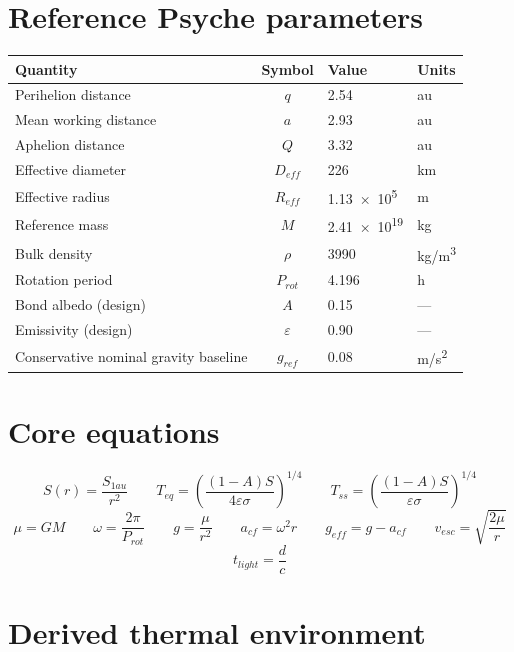 \documentclass[11pt,a4paper]{article}
\begin{document}
\section{Reference Psyche parameters}

\begin{center}
\begin{tabularx}{0.98\textwidth}{@{}l c >{\raggedleft\arraybackslash}X l@{}}
\toprule
Quantity & Symbol & Value & Units \\
\midrule
Perihelion distance & \(q\) & \num{2.54} & au \\
Mean working distance & \(a\) & \num{2.93} & au \\
Aphelion distance & \(Q\) & \num{3.32} & au \\
Effective diameter & \(D_{eff}\) & \num{226} & km \\
Effective radius & \(R_{eff}\) & \num{1.13e5} & m \\
Reference mass & \(M\) & \num{2.41e19} & kg \\
Bulk density & \(\rho\) & \num{3990} & \si{kg/m^3} \\
Rotation period & \(P_{rot}\) & \num{4.196} & h \\
Bond albedo (design) & \(A\) & \num{0.15} & --- \\
Emissivity (design) & \(\varepsilon\) & \num{0.90} & --- \\
Conservative nominal gravity baseline & \(g_{ref}\) & \num{0.08} & \si{m/s^2} \\
\bottomrule
\end{tabularx}
\end{center}

\section{Core equations}

\begin{formulaBox}
\[
S(r)=\frac{S_{1au}}{r^2}
\qquad
T_{eq}=\left(\frac{(1-A)S}{4\varepsilon\sigma}\right)^{1/4}
\qquad
T_{ss}=\left(\frac{(1-A)S}{\varepsilon\sigma}\right)^{1/4}
\]
\[
\mu = GM
\qquad
\omega = \frac{2\pi}{P_{rot}}
\qquad
g = \frac{\mu}{r^2}
\qquad
a_{cf}=\omega^2 r
\qquad
g_{eff}=g-a_{cf}
\qquad
v_{esc}=\sqrt{\frac{2\mu}{r}}
\]
\[
t_{light}=\frac{d}{c}
\]
\end{formulaBox}

\section{Derived thermal environment}
\end{document}
